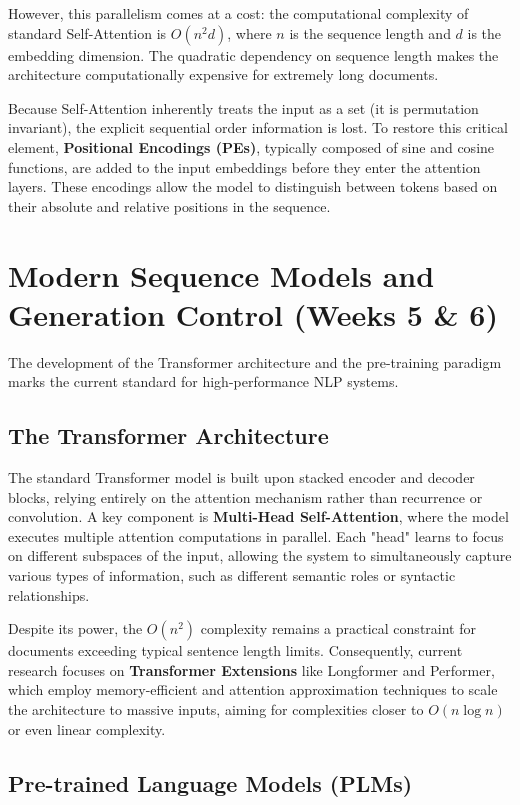 \documentclass{article}
\begin{document}
However, this parallelism comes at a cost: the computational complexity of standard Self-Attention is $O(n^2d)$, where $n$ is the sequence length and $d$ is the embedding dimension. The quadratic dependency on sequence length makes the architecture computationally expensive for extremely long documents.

Because Self-Attention inherently treats the input as a set (it is permutation invariant), the explicit sequential order information is lost. To restore this critical element, \textbf{Positional Encodings (PEs)}, typically composed of sine and cosine functions, are added to the input embeddings before they enter the attention layers. These encodings allow the model to distinguish between tokens based on their absolute and relative positions in the sequence.

\section{Modern Sequence Models and Generation Control (Weeks 5 \& 6)}

The development of the Transformer architecture and the pre-training paradigm marks the current standard for high-performance NLP systems.

\subsection{The Transformer Architecture}

The standard Transformer model is built upon stacked encoder and decoder blocks, relying entirely on the attention mechanism rather than recurrence or convolution. A key component is \textbf{Multi-Head Self-Attention}, where the model executes multiple attention computations in parallel. Each "head" learns to focus on different subspaces of the input, allowing the system to simultaneously capture various types of information, such as different semantic roles or syntactic relationships.

Despite its power, the $O(n^2)$ complexity remains a practical constraint for documents exceeding typical sentence length limits. Consequently, current research focuses on \textbf{Transformer Extensions} like Longformer and Performer, which employ memory-efficient and attention approximation techniques to scale the architecture to massive inputs, aiming for complexities closer to $O(n \log n)$ or even linear complexity.

\subsection{Pre-trained Language Models (PLMs)}
\end{document}
